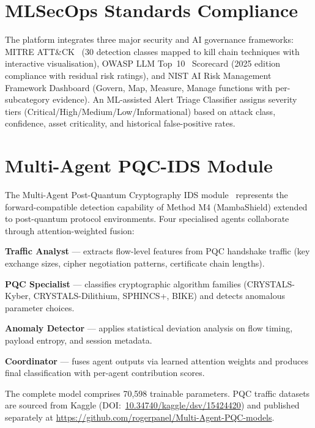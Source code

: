 \section{MLSecOps Standards Compliance}
\label{sec:mlsecops}

The platform integrates three major security and AI governance frameworks: MITRE ATT\&CK~\cite{Hernandez2015} (30 detection classes mapped to kill chain techniques with interactive visualisation), OWASP LLM Top~10~\cite{Xiong2020} Scorecard (2025 edition compliance with residual risk ratings), and NIST AI Risk Management Framework Dashboard (Govern, Map, Measure, Manage functions with per-subcategory evidence). An ML-assisted Alert Triage Classifier assigns severity tiers (Critical/High/Medium/Low/Informational) based on attack class, confidence, asset criticality, and historical false-positive rates.


\section{Multi-Agent PQC-IDS Module}
\label{sec:pqc_module}

The Multi-Agent Post-Quantum Cryptography IDS module~\cite{Anaedevha2026mapqc,NIST2024} represents the forward-compatible detection capability of Method M4 (MambaShield) extended to post-quantum protocol environments. Four specialised agents collaborate through attention-weighted fusion:

\noindent\textbf{Traffic Analyst} --- extracts flow-level features from PQC handshake traffic (key exchange sizes, cipher negotiation patterns, certificate chain lengths).

\noindent\textbf{PQC Specialist} --- classifies cryptographic algorithm families (CRYSTALS-Kyber, CRYSTALS-Dilithium, SPHINCS+, BIKE) and detects anomalous parameter choices.

\noindent\textbf{Anomaly Detector} --- applies statistical deviation analysis on flow timing, payload entropy, and session metadata.

\noindent\textbf{Coordinator} --- fuses agent outputs via learned attention weights and produces final classification with per-agent contribution scores.

The complete model comprises 70,598 trainable parameters. PQC traffic datasets are sourced from Kaggle (DOI:~\url{10.34740/kaggle/dsv/15424420}) and published separately at \url{https://github.com/rogerpanel/Multi-Agent-PQC-models}.


